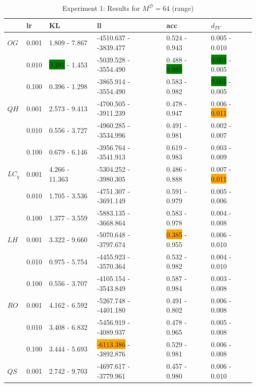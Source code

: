 \documentclass[shortabstract]{iithesis}
\begin{document}
\begin{table}[!ht]
\centering
\caption{Experiment 1: Results for $M^{\mathcal D}=64$ (range)}
\label{tab:res_ex1_64}
\vspace{5mm}
\begin{tabular}{llllll}  \hline
& lr &   KL &                      ll &               acc &              $d_{TV}$ \\ \hline
$OG$ & 0.001 &   1.809 - 7.867 &  -4510.637 - -3839.477 &  0.524 - 0.943 &   0.005 - 0.010 \\
        & 0.010 &   \colorbox{green}{0.391} - 1.453 &   -5039.528 - -3554.490 &  0.488 - \colorbox{green}{0.985} &  \colorbox{green}{0.001} - 0.005 \\
        & 0.100 &   0.396 - 1.298 &   -3865.914 - -3554.490 &  0.583 - 0.982 &  \colorbox{green}{0.001} - 0.005 \\
$QH$ & 0.001 &   2.573 - 9.413 &  -4700.505 - -3911.239 &  0.478 - 0.947 &  0.006 - \colorbox{orange}{0.011} \\
        & 0.010 &   0.556 - 3.727 &  -4960.285 - -3534.996 &  0.491 - 0.981 &  0.002 - 0.007 \\
        & 0.100 &   0.679 - 6.146 &  -3956.764 - -3541.913 &  0.619 - 0.983 &  0.003 - 0.009 \\
$LC_q$ & 0.001 &  4.266 - 11.363 &  -5304.252 - -3980.305 &  0.486 - 0.888 &  0.007 - \colorbox{orange}{0.011} \\
        & 0.010 &   1.705 - 3.536 &  -4751.307 - -3691.149 &  0.591 - 0.979 &  0.005 - 0.006 \\
        & 0.100 &   1.377 - 3.559 &  -5883.135 - -3668.864 &  0.583 - 0.978 &  0.004 - 0.008 \\
$LH$& 0.001 &    3.322 - 9.660 &  -5070.648 - -3797.674 &  \colorbox{orange}{0.385} - 0.955 &   0.006 - 0.010 \\
        & 0.010 &   0.975 - 5.754 &  -4455.923 - -3570.364 &  0.532 - 0.982 &   0.004 - 0.010 \\
        & 0.100 &   0.556 - 3.707 &  -4105.154 - -3543.849 &  0.587 - 0.984 &  0.003 - 0.008 \\
$RO$ & 0.001 &   4.162 - 6.592 &   -5267.748 - -4401.180 &  0.491 - 0.802 &  0.006 - 0.008 \\
        & 0.010 &   3.408 - 6.832 &  -5456.919 - -4089.937 &  0.478 - 0.965 &  0.005 - 0.008 \\
        & 0.100 &   3.444 - 5.693 &  \colorbox{orange}{-6113.386} - -3892.876 &  0.529 - 0.981 &  0.006 - 0.008 \\
$QS$ & 0.001 &   2.742 - 9.703 &  -4697.617 - -3779.961 &   0.457 - 0.980 &   0.006 - 0.010 \\

\end{tabular}
\end{table}
\end{document}
